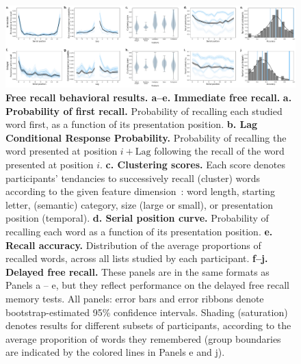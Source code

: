 \documentclass[10pt]{article}
\begin{document}
\begin{figure}
\centering
\includegraphics[width=1\textwidth]{figs/free_recall_behavior}
\caption{\textbf{Free recall behavioral results.  a--e. Immediate free
  recall.}  \textbf{a. Probability of first recall.}  Probability of
recalling each studied word first, as a function of its presentation
position.  \textbf{b. Lag Conditional Response Probability.}
Probability of recalling the word presented at position $i +
\mathrm{Lag}$ following the recall of the word presented at position
$i$.  \textbf{c. Clustering scores.}  Each score denotes participants'
tendancies to successively recall (cluster) words according to the
given feature dimension~\citep{PolyEtal09}: word length, starting letter, (semantic)
category, size (large or small), or presentation position (temporal).
\textbf{d. Serial position curve.}  Probability of recalling each word
as a function of its presentation position.  \textbf{e. Recall
  accuracy.}  Distribution of the average proportions of recalled
words, across all lists studied by each participant.  \textbf{f--j.
  Delayed free recall.}  These panels are in the same formats as
Panels a -- e, but they reflect performance on the delayed free recall
memory tests.  All panels: error bars and error ribbons denote bootstrap-estimated
95\% confidence intervals.  Shading (saturation) denotes results for
different subsets of participants, according to the average
proporition of words they remembered (group boundaries are indicated
by the colored lines in Panels e and j).}
\label{fig:fr_behavioral}
\end{figure}
\end{document}
